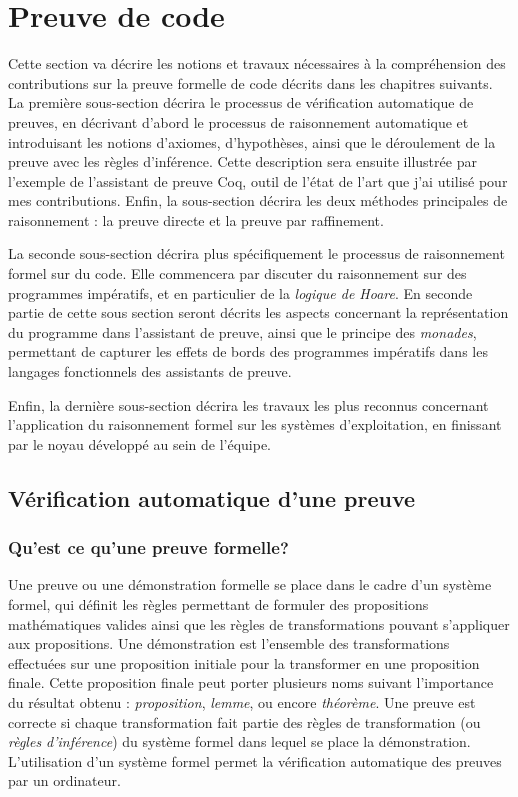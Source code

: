 	\section{Preuve de code}

	Cette section va décrire les notions et travaux nécessaires à la compréhension des contributions sur la preuve formelle de code décrits dans les chapitres suivants. La première sous-section décrira le processus de vérification automatique de preuves, en décrivant d'abord le processus de raisonnement automatique et introduisant les notions d'axiomes, d'hypothèses, ainsi que le déroulement de la preuve avec les règles d'inférence. Cette description sera ensuite illustrée par l'exemple de l'assistant de preuve Coq, outil de l'état de l'art que j'ai utilisé pour mes contributions. Enfin, la sous-section décrira les deux méthodes principales de raisonnement : la preuve directe et la preuve par raffinement.

	La seconde sous-section décrira plus spécifiquement le processus de raisonnement formel sur du code. Elle commencera par discuter du raisonnement sur des programmes impératifs, et en particulier de la \emph{logique de Hoare}. En seconde partie de cette sous section seront décrits les aspects concernant la représentation du programme dans l'assistant de preuve, ainsi que le principe des \emph{monades}, permettant de capturer les effets de bords des programmes impératifs dans les langages fonctionnels des assistants de preuve.

	Enfin, la dernière sous-section décrira les travaux les plus reconnus concernant l'application du raisonnement formel sur les systèmes d'exploitation, en finissant par le noyau développé au sein de l'équipe.

		\subsection{Vérification automatique d'une preuve}

			\subsubsection{Qu'est ce qu'une preuve formelle?}
			Une preuve ou une démonstration formelle se place dans le cadre d'un système formel, qui définit les règles permettant de formuler des propositions mathématiques valides ainsi que les règles de transformations pouvant s'appliquer aux propositions. Une démonstration est l'ensemble des transformations effectuées sur une proposition initiale pour la transformer en une proposition finale. Cette proposition finale peut porter plusieurs noms suivant l'importance du résultat obtenu : \emph{proposition}, \emph{lemme}, ou encore \emph{théorème}. Une preuve est correcte si chaque transformation fait partie des règles de transformation (ou \emph{règles d'inférence}) du système formel dans lequel se place la démonstration. L'utilisation d'un système formel permet la vérification automatique des preuves par un ordinateur.


